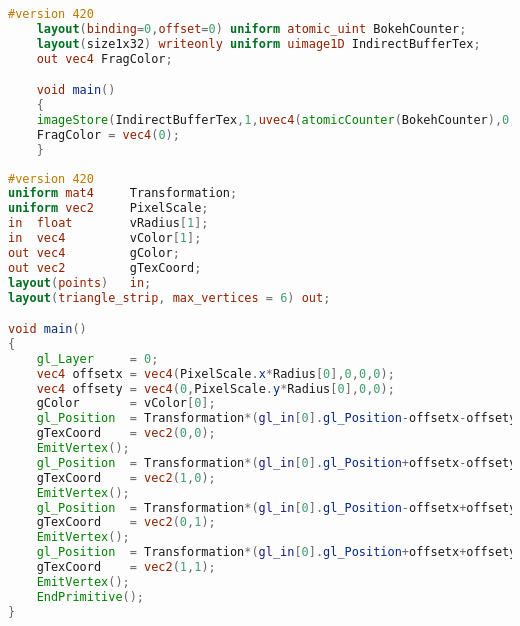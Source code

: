 \begin{lstlisting}[language=GLSL,float={htb},caption={Synchronization of the indirect buffer with the atomic counter \emph{(Pass 3/4)}. The function \codecmd{glMemoryBarrier} has to be call before this shader in order to ensure that all \bokeh data have been written.},label={Derousiers:synchronizationbokehfs}]
	#version 420
	layout(binding=0,offset=0) uniform atomic_uint BokehCounter;
	layout(size1x32) writeonly uniform uimage1D IndirectBufferTex;
	out vec4 FragColor;

	void main()
	{
	imageStore(IndirectBufferTex,1,uvec4(atomicCounter(BokehCounter),0,0,0));
	FragColor = vec4(0);
	}
\end{lstlisting}

\begin{lstlisting}[language=GLSL,float={htb},caption={Geometry shader for rendering bokeh \emph{(Pass 4)}.},label={Derousiers:renderingbokehgs}]
#version 420
uniform mat4     Transformation;
uniform vec2     PixelScale;
in  float        vRadius[1];
in  vec4         vColor[1];
out vec4         gColor;
out vec2         gTexCoord;
layout(points)   in;
layout(triangle_strip, max_vertices = 6) out;

void main()
{
	gl_Layer     = 0;
	vec4 offsetx = vec4(PixelScale.x*Radius[0],0,0,0);
	vec4 offsety = vec4(0,PixelScale.y*Radius[0],0,0);
	gColor       = vColor[0];
	gl_Position  = Transformation*(gl_in[0].gl_Position-offsetx-offsety);
	gTexCoord    = vec2(0,0);
	EmitVertex();
	gl_Position  = Transformation*(gl_in[0].gl_Position+offsetx-offsety);
	gTexCoord    = vec2(1,0);
	EmitVertex();
	gl_Position  = Transformation*(gl_in[0].gl_Position-offsetx+offsety);
	gTexCoord    = vec2(0,1);
	EmitVertex();
	gl_Position  = Transformation*(gl_in[0].gl_Position+offsetx+offsety);
	gTexCoord    = vec2(1,1);
	EmitVertex();
	EndPrimitive();
}
\end{lstlisting}















